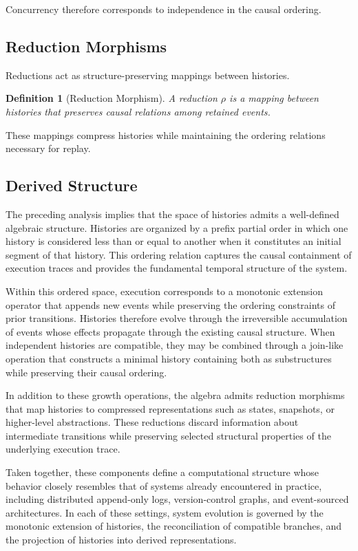 \documentclass[12pt]{article}
\newtheorem{definition}{Definition}
\begin{document}
Concurrency therefore corresponds to independence
in the causal ordering.

\subsection{Reduction Morphisms}

Reductions act as structure-preserving mappings
between histories.

\begin{definition}[Reduction Morphism]
A reduction $\rho$ is a mapping between histories
that preserves causal relations among retained
events.
\end{definition}

These mappings compress histories while maintaining
the ordering relations necessary for replay.

\subsection{Derived Structure}

The preceding analysis implies that the space of histories
admits a well-defined algebraic structure. Histories are
organized by a prefix partial order in which one history
is considered less than or equal to another when it
constitutes an initial segment of that history. This
ordering relation captures the causal containment of
execution traces and provides the fundamental temporal
structure of the system.

Within this ordered space, execution corresponds to a
monotonic extension operator that appends new events
while preserving the ordering constraints of prior
transitions. Histories therefore evolve through the
irreversible accumulation of events whose effects
propagate through the existing causal structure.
When independent histories are compatible, they may
be combined through a join-like operation that
constructs a minimal history containing both as
substructures while preserving their causal ordering.

In addition to these growth operations, the algebra
admits reduction morphisms that map histories to
compressed representations such as states, snapshots,
or higher-level abstractions. These reductions discard
information about intermediate transitions while
preserving selected structural properties of the
underlying execution trace.

Taken together, these components define a computational
structure whose behavior closely resembles that of
systems already encountered in practice, including
distributed append-only logs, version-control graphs,
and event-sourced architectures. In each of these
settings, system evolution is governed by the monotonic
extension of histories, the reconciliation of compatible
branches, and the projection of histories into derived
representations.
\end{document}
